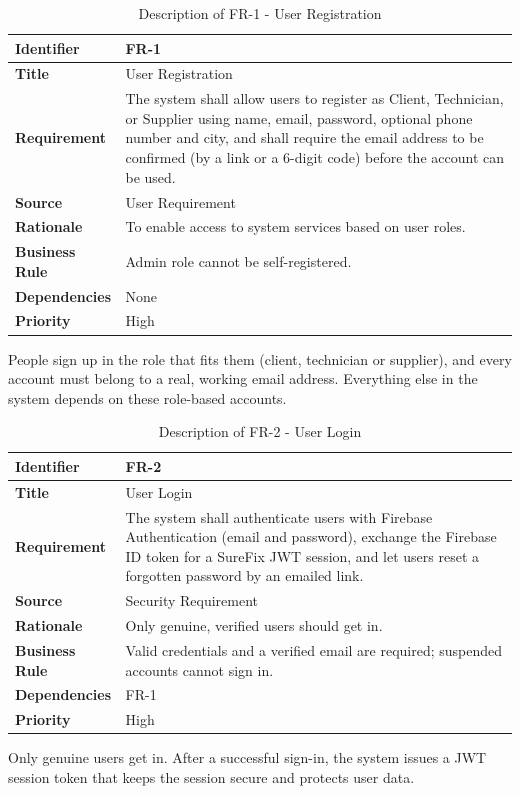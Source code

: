 \documentclass[A4paper,12pt]{report}
\theoremstyle{plain}
\theoremstyle{definition}
\theoremstyle{remark}
\numberwithin{equation}{section}
\begin{document}
\begin{table}[h!]
\centering
\caption{Description of FR-1 - User Registration}
\begin{tabular}{|p{}|p{}|}
\hline
\textbf{Identifier} & FR-1 \\ \hline
\textbf{Title} & User Registration \\ \hline
\textbf{Requirement} & The system shall allow users to register as Client, Technician, or Supplier using name, email, password, optional phone number and city, and shall require the email address to be confirmed (by a link or a 6-digit code) before the account can be used. \\ \hline
\textbf{Source} & User Requirement \\ \hline
\textbf{Rationale} & To enable access to system services based on user roles. \\ \hline
\textbf{Business Rule} & Admin role cannot be self-registered. \\ \hline
\textbf{Dependencies} & None \\ \hline
\textbf{Priority} & High \\ \hline
\end{tabular}
\end{table}

People sign up in the role that fits them (client, technician or supplier), and every account must belong to a real, working email address. Everything else in the system depends on these role-based accounts.

\begin{table}[h!]
\centering
\caption{Description of FR-2 - User Login}
\begin{tabular}{|p{}|p{}|}
\hline
\textbf{Identifier} & FR-2 \\ \hline
\textbf{Title} & User Login \\ \hline
\textbf{Requirement} & The system shall authenticate users with Firebase Authentication (email and password), exchange the Firebase ID token for a SureFix JWT session, and let users reset a forgotten password by an emailed link. \\ \hline
\textbf{Source} & Security Requirement \\ \hline
\textbf{Rationale} & Only genuine, verified users should get in. \\ \hline
\textbf{Business Rule} & Valid credentials and a verified email are required; suspended accounts cannot sign in. \\ \hline
\textbf{Dependencies} & FR-1 \\ \hline
\textbf{Priority} & High \\ \hline
\end{tabular}
\end{table}
Only genuine users get in. After a successful sign-in, the system issues a JWT session token that keeps the session secure and protects user data.
\newline
\end{document}
